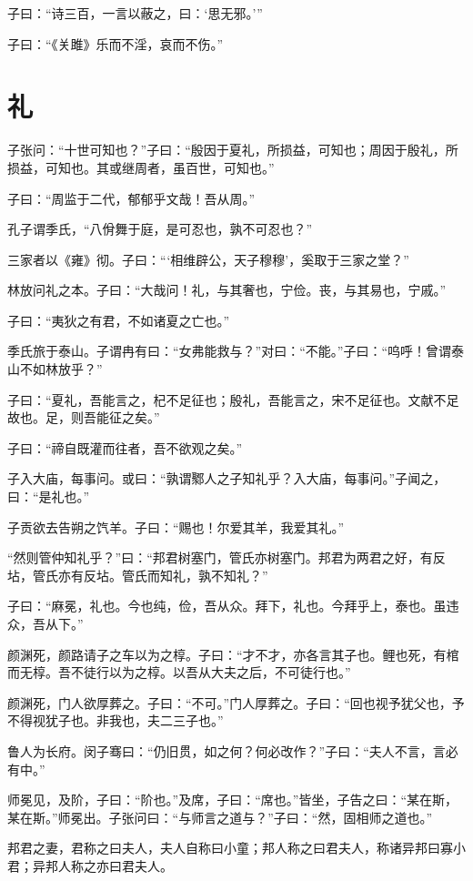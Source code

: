 \documentclass[a5paper]{ctexbook}
\begin{document}
    子曰：“诗三百，一言以蔽之，曰：‘思无邪。’”

    子曰：“《关雎》乐而不淫，哀而不伤。”

    \chapter{礼}

    子张问：“十世可知也？”子曰：“殷因于夏礼，所损益，可知也；周因于殷礼，所损益，可知也。其或继周者，虽百世，可知也。”

    子曰：“周监于二代，郁郁乎文哉！吾从周。”

    孔子谓季氏，“八佾舞于庭，是可忍也，孰不可忍也？”

    三家者以《雍》彻。子曰：“‘相维辟公，天子穆穆’，奚取于三家之堂？”

    林放问礼之本。子曰：“大哉问！礼，与其奢也，宁俭。丧，与其易也，宁戚。”

    子曰：“夷狄之有君，不如诸夏之亡也。”

    季氏旅于泰山。子谓冉有曰：“女弗能救与？”对曰：“不能。”子曰：“呜呼！曾谓泰山不如林放乎？”

    子曰：“夏礼，吾能言之，杞不足征也；殷礼，吾能言之，宋不足征也。文献不足故也。足，则吾能征之矣。”

    子曰：“禘自既灌而往者，吾不欲观之矣。”

    子入大庙，每事问。或曰：“孰谓鄹人之子知礼乎？入大庙，每事问。”子闻之，曰：“是礼也。”

    子贡欲去告朔之饩羊。子曰：“赐也！尔爱其羊，我爱其礼。”

    “然则管仲知礼乎？”曰：“邦君树塞门，管氏亦树塞门。邦君为两君之好，有反坫，管氏亦有反坫。管氏而知礼，孰不知礼？”

    子曰：“麻冕，礼也。今也纯，俭，吾从众。拜下，礼也。今拜乎上，泰也。虽违众，吾从下。”

    颜渊死，颜路请子之车以为之椁。子曰：“才不才，亦各言其子也。鲤也死，有棺而无椁。吾不徒行以为之椁。以吾从大夫之后，不可徒行也。”

    颜渊死，门人欲厚葬之。子曰：“不可。”门人厚葬之。子曰：“回也视予犹父也，予不得视犹子也。非我也，夫二三子也。”

    鲁人为长府。闵子骞曰：“仍旧贯，如之何？何必改作？”子曰：“夫人不言，言必有中。”

    师冕见，及阶，子曰：“阶也。”及席，子曰：“席也。”皆坐，子告之曰：“某在斯，某在斯。”师冕出。子张问曰：“与师言之道与？”子曰：“然，固相师之道也。”

    邦君之妻，君称之曰夫人，夫人自称曰小童；邦人称之曰君夫人，称诸异邦曰寡小君；异邦人称之亦曰君夫人。
\end{document}
